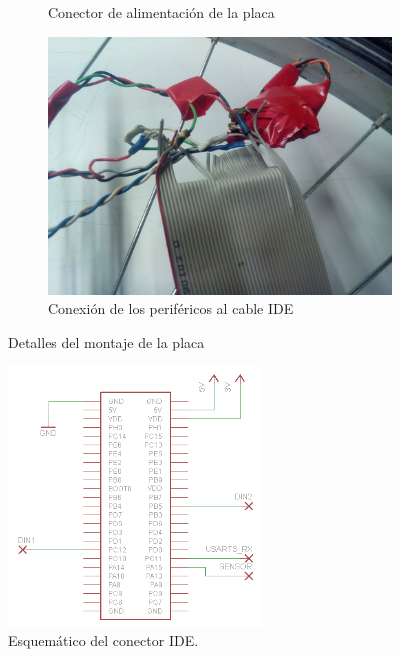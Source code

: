 \begin{figure}[!ht]
\begin{subfigure}[t]{0.3\textwidth}
		\caption{Conector de alimentación de la placa}
		\label{fig:montajePlaca-alimentacion}
	\end{subfigure}
	\hspace{0.5cm}
	\begin{subfigure}[t]{0.3\textwidth}
		\centering
		\includegraphics[width=\textwidth]{images/montajePlaca-IDE}
		\caption{Conexión de los periféricos al cable IDE}
		\label{fig:montajePlaca-IDE}
	\end{subfigure}

	\caption{Detalles del montaje de la placa}
	\label{fig:montajePlaca}
\end{figure}

\begin{figure}[!ht]
	\centering
	\includegraphics[width=0.6\textwidth]{images/montajePlaca-IDEsch}
	\caption{Esquemático del conector IDE.}
	\label{fig:montajePlaca-IDEsch}
\end{figure}

